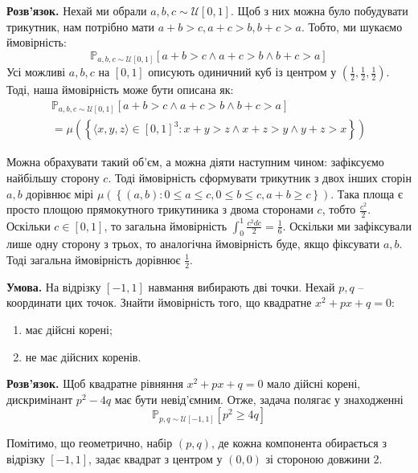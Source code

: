 \documentclass[oneside,solution]{karazin-prob-theory-assign}
\begin{document}
\textbf{Розв'язок.} Нехай ми обрали $a,b,c \sim \mathcal{U}[0,1]$. Щоб з них можна було побудувати трикутник, нам потрібно мати $a+b>c, a+c>b, b+c>a$. Тобто, ми шукаємо ймовірність:
\begin{equation}
    \mathbb{P}_{a,b,c \sim \mathcal{U}[0,1]}\left[a+b>c \wedge a+c>b \wedge b+c>a\right]
\end{equation}
Усі можливі $a,b,c$ на $[0,1]$ описують одиничний куб із центром у $\left(\frac{1}{2},\frac{1}{2},\frac{1}{2}\right)$. Тоді, наша ймовірність може бути описана як:
\begin{gather}
    \mathbb{P}_{a,b,c \sim \mathcal{U}[0,1]}\left[a+b>c \wedge a+c>b \wedge b+c>a\right] \nonumber \\
    = \mu\left(\left\{ \langle x,y,z\rangle \in [0,1]^3: x+y>z \wedge x+z>y \wedge y+z>x \right\}\right)
\end{gather}

Можна обрахувати такий об'єм, а можна діяти наступним чином: зафіксуємо найбільшу сторону $c$. Тоді ймовірність сформувати трикутник з двох інших сторін $a,b$ дорівнює мірі $\mu\left(\left\{(a,b):0 \leq a\leq c, 0 \leq b \leq c, a+b \geq c\right\}\right)$. Така площа є просто площою прямокутного трикутиника з двома сторонами $c$, тобто $\frac{c^2}{2}$. Оскільки $c\in[0,1]$, то загальна ймовірність $\int_0^1 \frac{c^2dc}{2} = \frac{1}{6}$. Оскільки ми зафіксували лише одну сторону з трьох, то аналогічна ймовірність буде, якщо фіксувати $a,b$. Тоді загальна ймовірність дорівнює $\boxed{\frac{1}{2}}$.


\hspace{20px}\textbf{Умова.} На відрізку $[-1,1]$ навмання вибирають дві точки. Нехай $p,q$ -- координати цих точок. Знайти ймовірність того, що квадратне $x^2+px+q=0$:
\begin{enumerate}
    \item має дійсні корені;
    \item не має дійсних коренів.
\end{enumerate}

\textbf{Розв'язок.} Щоб квадратне рівняння $x^2+px+q=0$ мало дійсні корені, дискримінант $p^2-4q$ має бути невід'ємним. Отже, задача полягає у знаходженні
\begin{equation}
    \mathbb{P}_{p,q \sim \mathcal{U}[-1,1]}\left[p^2 \geq 4q\right]
\end{equation}

Помітимо, що геометрично, набір $(p,q)$, де кожна компонента обирається з відрізку $[-1,1]$, задає квадрат з центром у $(0,0)$ зі стороною довжини $2$.
\end{document}
